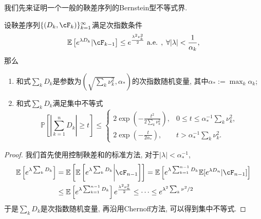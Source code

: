 我们先来证明一个一般的鞅差序列的Bernstein型不等式界. 
\begin{theorem}
	设鞅差序列$\{(D_k, \cF_k)\}_{k=1}^{\infty}$满足次指数条件
	\begin{equation*}
		\mathbb{E}\left[ e^{\lambda D_k} | \cF_{k-1} \right] 
		\leq e^{\frac{\lambda^2 \nu_k^2}{2}} \text{ a.e. },\; \forall |\lambda| < \frac{1}{\alpha_k}, 
	\end{equation*}
	那么
	\begin{enumerate}[label=(\arabic*)]
		\item 和式$\sum_k D_k$是参数为$\left( \sqrt{\sum_k \nu_k^2}, \alpha_* \right)$的次指数随机变量, 其中$\alpha_* := \max_k \alpha_k$; 
		\item 和式$\sum_k D_k$满足集中不等式
			\begin{equation*}
				\mathbb{P} \left[ \left| \sum_{k=1}^n D_k \right| \geq t \right] \leq 
				\begin{cases}
					2 \exp\left( -\frac{t^2}{2 \sum_k \nu_k^2} \right), & 0 \leq t \leq \alpha_*^{-1} \sum_k \nu_k^2, \\
					2 \exp\left(- \frac{t}{2 \alpha_*}\right), & t > \alpha_*^{-1} \sum_k \nu_k^2.
				\end{cases}
			\end{equation*}
	\end{enumerate}
\end{theorem}
\begin{proof}
	我们首先使用控制鞅差和的标准方法, 对于$|\lambda| < \alpha_*^{-1}$, 
	\begin{align*}
		\mathbb{E}\left[ e^{\lambda \sum_k D_k} \right]
		&= \mathbb{E}\left[ \mathbb{E}\left[ e^{\lambda \sum_k D_k} \bigg| \cF_{n-1} \right] \right] 
		= \mathbb{E}\left[ e^{\lambda \sum_{k=1}^{n-1} D_k} \mathbb{E}[e^{\lambda D_n} | \cF_{n-1}] \right] \\
		&\leq \mathbb{E}\left[ e^{\lambda \sum_{k=1}^{n-1} D_k} \right]  e^{\frac{\lambda^2 \nu_n^2}{2}} 
		\leq \cdots
		\leq e^{\lambda^2 \sum_k \nu^2 / 2}
	\end{align*}
	于是$\sum_k D_k$是次指数随机变量, 再沿用Chernoff方法, 可以得到集中不等式. 
\end{proof}

